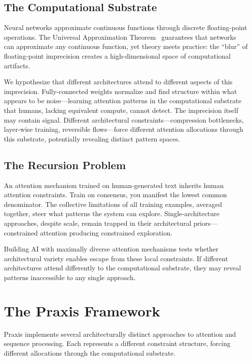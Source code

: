\documentclass{article}
\begin{document}
\subsection{The Computational Substrate}

Neural networks approximate continuous functions through discrete floating-point operations. The Universal Approximation Theorem~\cite{hornik1989multilayer} guarantees that networks can approximate any continuous function, yet theory meets practice: the ``blur'' of floating-point imprecision creates a high-dimensional space of computational artifacts.

We hypothesize that different architectures attend to different aspects of this imprecision. Fully-connected weights normalize and find structure within what appears to be noise—learning attention patterns in the computational substrate that humans, lacking equivalent compute, cannot detect. The imprecision itself may contain signal. Different architectural constraints—compression bottlenecks, layer-wise training, reversible flows—force different attention allocations through this substrate, potentially revealing distinct pattern spaces.

\subsection{The Recursion Problem}

An attention mechanism trained on human-generated text inherits human attention constraints. Train on consensus, you manifest the lowest common denominator. The collective limitations of all training examples, averaged together, steer what patterns the system can explore. Single-architecture approaches, despite scale, remain trapped in their architectural priors—constrained attention producing constrained exploration.

Building AI with maximally diverse attention mechanisms tests whether architectural variety enables escape from these local constraints. If different architectures attend differently to the computational substrate, they may reveal patterns inaccessible to any single approach.

\section{The Praxis Framework}

Praxis implements several architecturally distinct approaches to attention and sequence processing. Each represents a different constraint structure, forcing different allocations through the computational substrate.
\end{document}
